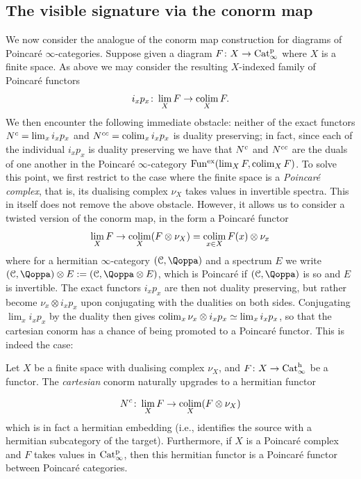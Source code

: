 \medskip



\subsection{The visible signature via the conorm map}

We now consider the analogue of the conorm map construction for diagrams of Poincaré $\infty$-categories. 
Suppose given a diagram $F\colon X \to \mathrm{Cat}^{\mathrm p}_\infty$ where $X$ is a finite space. As above we may consider the resulting $X$-indexed family of Poincaré functors
\[
i_xp_x\colon \lim_X F \to \mathop{\mathrm{colim}}_X F .
\]
We then encounter the following immediate obstacle: neither of the exact functors $N^c = \lim_x i_xp_x$ and $N^{cc} = \mathop{\mathrm{colim}}_xi_xp_x$ is duality preserving; in fact, since each of the individual $i_xp_x$ is duality preserving we have that $N^c$ and $N^{cc}$ are the duals of one another in the Poincaré $\infty$-category $\operatorname{Fun^{ex}}(\lim_X F,\mathop{\mathrm{colim}}_X F)$.
To solve this point, we first restrict to the case where the finite space is a \emph{Poincaré complex}, that is, its dualising complex $\nu_X$ takes values in invertible spectra. This in itself does not remove the above obstacle. However, it allows us to consider a twisted version of the conorm map, in the form a Poincaré functor
\[
\lim_X F \to \mathop{\mathrm{colim}}_X(F\otimes \nu_X) = \mathop{\mathrm{colim}}_{x \in X} F(x) \otimes \nu_x
\]
where for a hermitian $\infty$-category $(\C,\QF)$ and a spectrum $E$ we write $(\C,\QF)\otimes E := (\C,\QF\otimes E)$, which is Poincaré if $(\C,\QF)$ is so and $E$ is invertible. The exact functors $i_xp_x$ are then not duality preserving, but rather become $\nu_x\otimes i_xp_x$ upon conjugating with the dualities on both sides. Conjugating $\lim_x i_xp_x$ by the duality then gives $\mathop{\mathrm{colim}}_x \nu_x\otimes i_xp_x \simeq \lim_x i_xp_x$, so that the cartesian conorm %
has a chance of being promoted to a Poincaré functor. This is indeed the case:


\begin{proposition}
\label{proposition:hermitian_conorm}%
Let $X$ be a finite space with dualising complex $\nu_X$, and $F\colon X\to \mathrm{Cat}^\mathrm{h}_\infty$ be a functor. 
The \emph{cartesian} conorm naturally upgrades to a hermitian functor 
 
\[
N^c\colon \lim_X F \to \mathop{\mathrm{colim}}_X (F\otimes \nu_X)
\]
which is in fact a hermitian embedding (i.e., identifies the source with a hermitian subcategory of the target).   
Furthermore, if $X$ is a Poincar\'e complex and $F$ takes values in $\mathrm{Cat}^{\mathrm p}_\infty$, then this hermitian functor is a Poincar\'e functor between Poincar\'e categories.
\end{proposition}

